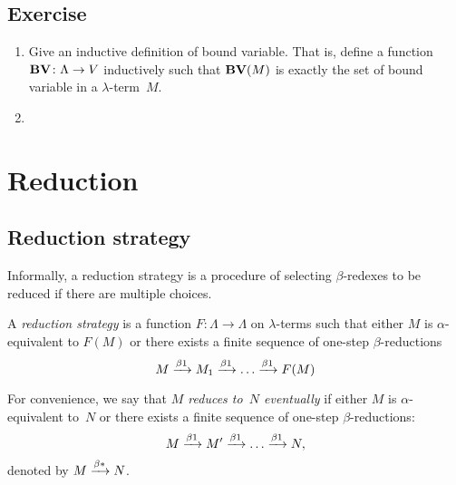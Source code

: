 \subsection*{Exercise}
\begin{enumerate}
  \item Give an inductive definition of bound variable. That is, define a
    function $\mathbf{BV}\colon \Lambda \to V$ inductively
    such that $\mathbf{BV}(M)$ is exactly the set of bound variable in a
    $\lambda$-term~$M$.
  \item {}
\end{enumerate}

\section{Reduction}
\subsection{Reduction strategy}
Informally, a reduction strategy is a procedure of selecting $\beta$-redexes
to be reduced if there are multiple choices. 
\begin{definition}
  A \emph{reduction strategy} is a function $F\colon\Lambda\to\Lambda$ on
  $\lambda$-terms such that either $M$ is $\alpha$-equivalent to $F(M)$ or there
  exists a finite sequence of one-step $\beta$-reductions
      \[
        M \xrightarrow{\beta1} M_1 \xrightarrow{\beta1} \dots \xrightarrow{\beta1} F(M)
      \]
\end{definition}
For convenience, we say that \emph{$M$ reduces to~$N$ eventually} if either $M$ is
$\alpha$-equivalent to~$N$ or there exists a finite sequence of
one-step $\beta$-reductions:
\[
  M \xrightarrow{\beta1} M' \xrightarrow{\beta1} \dots \xrightarrow{\beta1} N,
\]
denoted by $M \xrightarrow{\beta*} N$.


